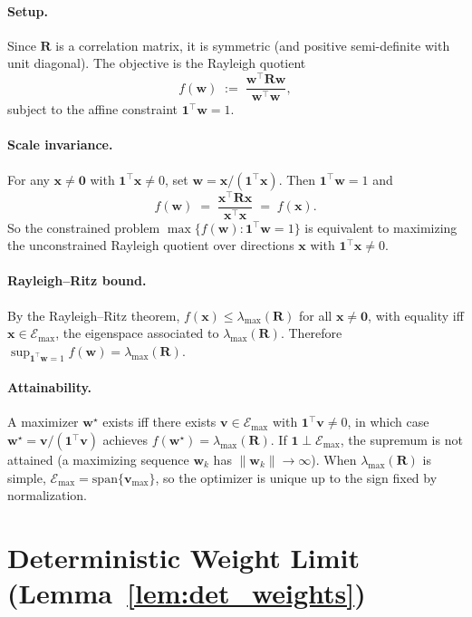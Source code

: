 \documentclass{article}
\def\vzero{{\bm{0}}}
\def\vone{{\bm{1}}}
\def\vv{{\bm{v}}}
\def\vw{{\bm{w}}}
\def\vx{{\bm{x}}}
\def\mR{{\bm{R}}}
\def\gE{{\mathcal{E}}}
\begin{document}
\paragraph{Setup.}
Since $\mR$ is a correlation matrix, it is symmetric (and positive semi-definite with unit diagonal). The objective is the Rayleigh quotient
\[
    f(\vw) \;:=\; \frac{\vw^\top \mR\vw}{\vw^\top\vw},
\]
subject to the affine constraint $\vone^\top\vw = 1$.

\paragraph{Scale invariance.}
For any $\vx \neq \vzero$ with $\vone^\top\vx \neq 0$, set $\vw = \vx/(\vone^\top\vx)$. Then $\vone^\top\vw = 1$ and
\[
    f(\vw) \;=\; \frac{\vx^\top\mR\vx}{\vx^\top\vx} \;=\; f(\vx).
\]
So the constrained problem $\max\{f(\vw) : \vone^\top\vw = 1\}$ is equivalent to maximizing the unconstrained Rayleigh quotient over directions $\vx$ with $\vone^\top\vx\neq 0$.

\paragraph{Rayleigh--Ritz bound.}
By the Rayleigh--Ritz theorem, $f(\vx) \leq \lambda_{\mathrm{max}}(\mR)$ for all $\vx\neq\vzero$, with equality iff $\vx \in \gE_{\mathrm{max}}$, the eigenspace associated to $\lambda_{\mathrm{max}}(\mR)$. Therefore $\sup_{\vone^\top\vw=1}f(\vw) = \lambda_{\mathrm{max}}(\mR)$.

\paragraph{Attainability.}
A maximizer $\vw^\star$ exists iff there exists $\vv \in \gE_{\mathrm{max}}$ with $\vone^\top\vv\neq 0$, in which case $\vw^\star = \vv/(\vone^\top\vv)$ achieves $f(\vw^\star) = \lambda_{\mathrm{max}}(\mR)$. If $\vone \perp \gE_{\mathrm{max}}$, the supremum is not attained (a maximizing sequence $\vw_k$ has $\|\vw_k\|\to\infty$). When $\lambda_{\mathrm{max}}(\mR)$ is simple, $\gE_{\mathrm{max}} = \mathrm{span}\{\vv_{\mathrm{max}}\}$, so the optimizer is unique up to the sign fixed by normalization.


\section{Deterministic Weight Limit (Lemma~\ref{lem:det_weights})}\label{app:det_weights}
\end{document}
